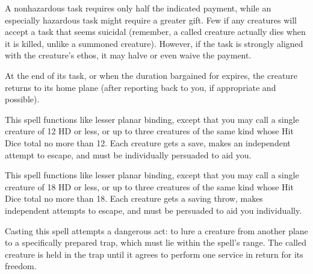 \begin{multicols}{2}
\begin{small}
\smallskip\noindent A nonhazardous task requires only half the indicated payment, while an especially hazardous task might require a greater gift. Few if any creatures will accept a task that seems suicidal (remember, a called creature actually dies when it is killed, unlike a summoned creature). However, if the task is strongly aligned with the creature's ethos, it may halve or even waive the payment. 

\smallskip\noindent At the end of its task, or when the duration bargained for expires, the creature returns to its home plane (after reporting back to you, if appropriate and possible).


\noindent This spell functions like lesser planar binding, except that you may call a single creature of 12 HD or less, or up to three creatures of the same kind whose Hit Dice total no more than 12. Each creature gets a save, makes an independent attempt to escape, and must be individually persuaded to aid you.

\noindent This spell functions like lesser planar binding, except that you may call a single creature of 18 HD or less, or up to three creatures of the same kind whose Hit Dice total no more than 18. Each creature gets a saving throw, makes independent attempts to escape, and must be persuaded to aid you individually.

\noindent Casting this spell attempts a dangerous act: to lure a creature from another plane to a specifically prepared trap, which must lie within the spell's range. The called creature is held in the trap until it agrees to perform one service in return for its freedom.


\end{small}
\end{multicols}
